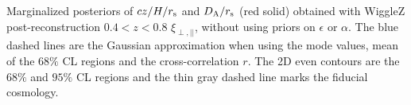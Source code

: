 \label{fig:HDA_z48_noprior} Marginalized posteriors of $cz/H/r_{\rm s}$ and $D_{\rm A}/r_{\rm s}$ (red solid) obtained with WiggleZ post-reconstruction $0.4<z<0.8$ $\xi_{\perp, ||}$, without using priors on $\epsilon$ or $\alpha$. The blue dashed lines are the Gaussian approximation when using the mode values, mean of the 68$\%$ CL regions and the cross-correlation $r$. The 2D even contours are the $68\%$ and $95\%$ CL regions and the thin gray dashed line marks the fiducial cosmology.